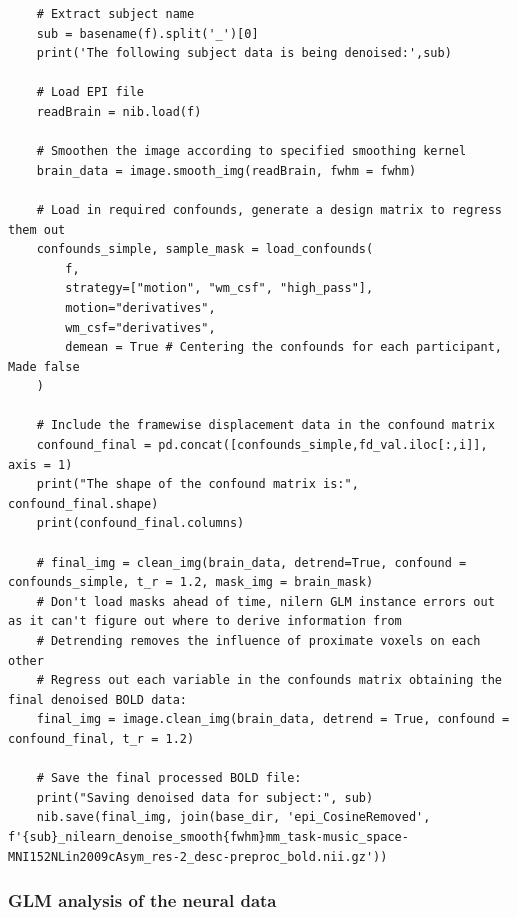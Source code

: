 \begin{lstlisting}
    # Extract subject name
    sub = basename(f).split('_')[0]
    print('The following subject data is being denoised:',sub)
    
    # Load EPI file
    readBrain = nib.load(f)
    
    # Smoothen the image according to specified smoothing kernel
    brain_data = image.smooth_img(readBrain, fwhm = fwhm)
        
    # Load in required confounds, generate a design matrix to regress them out
    confounds_simple, sample_mask = load_confounds(
        f,
        strategy=["motion", "wm_csf", "high_pass"],
        motion="derivatives",
        wm_csf="derivatives",
        demean = True # Centering the confounds for each participant, Made false
    )
    
    # Include the framewise displacement data in the confound matrix
    confound_final = pd.concat([confounds_simple,fd_val.iloc[:,i]], axis = 1)
    print("The shape of the confound matrix is:", confound_final.shape)
    print(confound_final.columns)
        
    # final_img = clean_img(brain_data, detrend=True, confound = confounds_simple, t_r = 1.2, mask_img = brain_mask)
    # Don't load masks ahead of time, nilern GLM instance errors out as it can't figure out where to derive information from
    # Detrending removes the influence of proximate voxels on each other
    # Regress out each variable in the confounds matrix obtaining the final denoised BOLD data:
    final_img = image.clean_img(brain_data, detrend = True, confound = confound_final, t_r = 1.2) 
    
    # Save the final processed BOLD file:
    print("Saving denoised data for subject:", sub)
    nib.save(final_img, join(base_dir, 'epi_CosineRemoved', f'{sub}_nilearn_denoise_smooth{fwhm}mm_task-music_space-MNI152NLin2009cAsym_res-2_desc-preproc_bold.nii.gz'))
\end{lstlisting}


\subsubsection{GLM analysis of the neural data}

